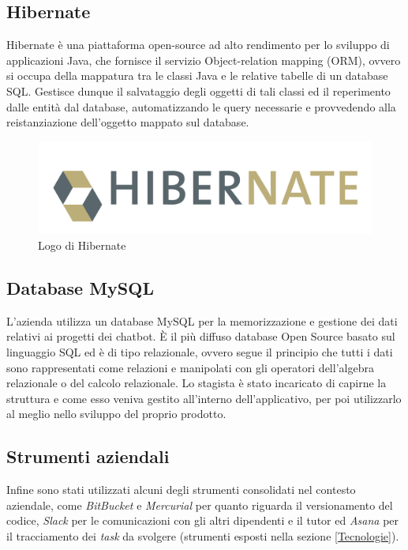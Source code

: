 \subsection{Hibernate}
Hibernate è una piattaforma open-source ad alto rendimento per lo sviluppo di applicazioni Java, che fornisce il servizio Object-relation mapping (ORM), ovvero si occupa della mappatura tra le classi Java e le relative tabelle di un database SQL.
Gestisce dunque il salvataggio degli oggetti di tali classi ed il reperimento dalle entità dal database, automatizzando le query necessarie e provvedendo alla reistanziazione dell’oggetto mappato sul database.
\begin{figure}[h]
	\centering
	\includegraphics[scale=0.35]{../Immagini/Hibernate.png}
	\caption{Logo di Hibernate}
\end{figure}

\subsection{Database MySQL} 
L'azienda \azienda{} utilizza un database MySQL per la memorizzazione e gestione dei dati relativi ai progetti dei \gls{chatbot}. È il più diffuso database Open Source basato sul linguaggio SQL ed è di tipo relazionale, ovvero segue il principio che tutti i dati sono rappresentati come relazioni e manipolati con gli operatori dell’algebra relazionale o del calcolo relazionale.
Lo stagista è stato incaricato di capirne la struttura e come esso veniva gestito all'interno dell'applicativo, per poi utilizzarlo al meglio nello sviluppo del proprio prodotto.\\

\subsection{Strumenti aziendali}
Infine sono stati utilizzati alcuni degli strumenti consolidati nel contesto aziendale, come \emph{BitBucket} e \emph{Mercurial} per quanto riguarda il versionamento del codice, \emph{Slack} per le comunicazioni con gli altri dipendenti e il tutor ed \emph{Asana} per il tracciamento dei \emph{task} da svolgere (strumenti esposti nella sezione \ref{Tecnologie}).

